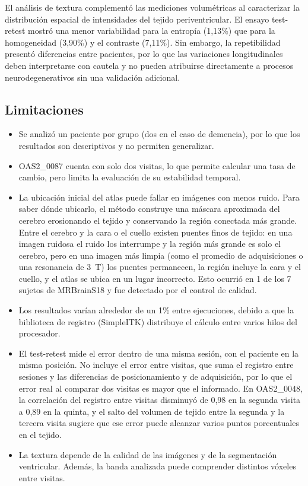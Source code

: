 \documentclass[10pt]{article}
\begin{document}
El análisis de textura complementó las mediciones volumétricas al caracterizar la distribución espacial de intensidades del tejido periventricular. El ensayo test-retest mostró una menor variabilidad para la entropía (1,13\%) que para la homogeneidad (3,90\%) y el contraste (7,11\%). Sin embargo, la repetibilidad presentó diferencias entre pacientes, por lo que las variaciones longitudinales deben interpretarse con cautela y no pueden atribuirse directamente a procesos neurodegenerativos sin una validación adicional.
\subsection{Limitaciones}
 
\begin{itemize}
    \item Se analizó un paciente por grupo (dos en el caso de demencia), por lo que los resultados son descriptivos y no permiten generalizar.
    \item OAS2\_0087 cuenta con solo dos visitas, lo que permite calcular una tasa de cambio, pero limita la evaluación de su estabilidad temporal.
    \item La ubicación inicial del atlas puede fallar en imágenes con menos ruido. Para saber dónde ubicarlo, el método construye una máscara aproximada del cerebro erosionando el tejido y conservando la región conectada más grande. Entre el cerebro y la cara o el cuello existen puentes finos de tejido: en una imagen ruidosa el ruido los interrumpe y la región más grande es solo el cerebro, pero en una imagen más limpia (como el promedio de adquisiciones o una resonancia de 3~T) los puentes permanecen, la región incluye la cara y el cuello, y el atlas se ubica en un lugar incorrecto. Esto ocurrió en 1 de los 7 sujetos de MRBrainS18 y fue detectado por el control de calidad.
    \item Los resultados varían alrededor de un 1\% entre ejecuciones, debido a que la biblioteca de registro (SimpleITK) distribuye el cálculo entre varios hilos del procesador.
    \item El test-retest mide el error dentro de una misma sesión, con el paciente en la misma posición. No incluye el error entre visitas, que suma el registro entre sesiones y las diferencias de posicionamiento y de adquisición, por lo que el error real al comparar dos visitas es mayor que el informado. En OAS2\_0048, la correlación del registro entre visitas disminuyó de 0,98 en la segunda visita a 0,89 en la quinta, y el salto del volumen de tejido entre la segunda y la tercera visita sugiere que ese error puede alcanzar varios puntos porcentuales en el tejido.
    \item La textura depende de la calidad de las imágenes y de la segmentación ventricular. Además, la banda analizada puede comprender distintos vóxeles entre visitas.

\end{itemize}
 
\end{document}
